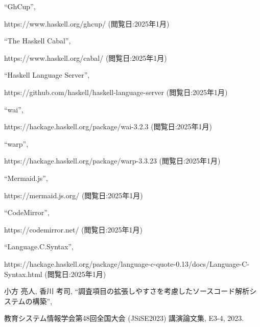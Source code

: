 \documentclass{cssspaper}
\begin{document}
\begin{thebibliography}{99}
``GhCup'',

https://www.haskell.org/ghcup/ (閲覧日:2025年1月)

``The Haskell Cabal'',

https://www.haskell.org/cabal/ (閲覧日:2025年1月)

``Haskell Language Server'',

https://github.com/haskell/haskell-language-server (閲覧日:2025年1月)

``wai'',

https://hackage.haskell.org/package/wai-3.2.3 (閲覧日:2025年1月)

``warp'',

https://hackage.haskell.org/package/warp-3.3.23 (閲覧日:2025年1月)

``Mermaid.js'',

https://mermaid.js.org/ (閲覧日:2025年1月)

``CodeMirror'',

https://codemirror.net/ (閲覧日:2025年1月)

``Language.C.Syntax'',

https://hackage.haskell.org/package/language-c-quote-0.13/docs/Language-C-Syntax.html (閲覧日:2025年1月)

小方 亮人, 香川 考司, ``調査項目の拡張しやすさを考慮したソースコード解析システムの構築'',

教育システム情報学会第48回全国大会 (JSiSE2023) 講演論文集, E3-4, 2023.

\end{thebibliography}
\end{document}
